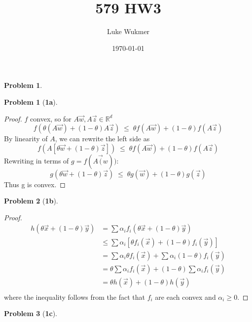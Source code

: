 \documentclass[10pt]{article}
\theoremstyle{plain}
\theoremstyle{definition}
\newtheorem{prob}{Problem}
\newtheorem*{prob*}{Problem}
\providecommand{\R}{\mathbb{R}}%
\numberwithin{equation}{section}
\begin{document}
\lstset{language=Python}

\title{\Large{579 HW3}}
\author{Luke Wukmer}
\date{\today}
\maketitle \normalsize \thispagestyle{empty} %

\begin{prob}
\end{prob}
\begin{prob*}[\bf{1a}]
\end{prob*}

\begin{proof}
  $f$ convex, so for $ A\vec{w} , A \vec{z} \in \R^{d} $
  \[
    f \left(\theta (A \vec{w}) + (1 - \theta) A \vec{z} \right)
    \; \leq \;
    \theta f( A \vec{w} ) + (1 - \theta) f( A \vec{z} )
  \]
  By linearity of $A$, we can rewrite the left side as
  \[
    f \left(A \left[ \theta \vec{w} + (1 - \theta) \vec{z} \right]\right) 
    \; \leq \;
    \theta f( A \vec{w} ) + (1 - \theta) f( A \vec{z} )
  \]
  Rewriting in terms of $g = f(A\vec(w))$:
  \[
    g \left( \theta \vec{w} + (1 - \theta) \vec{z} \right)
    \; \leq \;
    \theta g(\vec{w}) + (1 - \theta) g(\vec{z})
  \]
  Thus g is convex.
\qedhere  
\end{proof}
\begin{prob*}[\bf{1b}]
\end{prob*}

\begin{proof}
  \[
  \begin{aligned}
    h \left( \theta \vec{x} + (1-\theta) \vec{y} \right)
    &= \sum \alpha_i f_i \left( \theta \vec{x} + (1-\theta) \vec{y} \right) \\
    &\leq \sum \alpha_i \left[ \theta f_i( \vec{x})
                              + (1-\theta) f_i(\vec{y}) \right] \\
    &= \sum \alpha_i \theta f_i( \vec{x})
            + \sum \alpha_i (1-\theta) f_i(\vec{y}) \\
    &= \theta \sum \alpha_i f_i( \vec{x})
            + (1-\theta) \sum \alpha_i  f_i(\vec{y}) \\
    &= \theta h(\vec{x}) + (1-\theta) h(\vec{y}) \\
  \end{aligned}
  \]
  where the inequality follows from the fact that $f_i$ are each convex and 
  $\alpha_i \geq 0$.
\end{proof}
\clearpage
\begin{prob*}[\bf{1c}]
\end{prob*}
\end{document}
